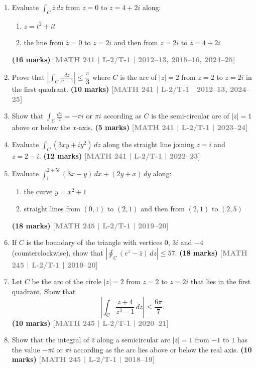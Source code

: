\documentclass[12pt]{article}
\newcommand{\yr}[1]{\hfill\textcolor{gray}{\small\textbf{[#1]}}}
\newcommand{\mk}[1]{\textcolor{orange!70!black}{\small\textbf{(#1 marks)}}}
\begin{document}
\begin{enumerate}

  \item Evaluate $\displaystyle\int_{C}\bar{z}\,dz$ from $z=0$ to $z=4+2i$ along: 
\begin{enumerate}
  \item $z=t^{2}+it$
  \item the line from $z=0$ to $z=2i$ and then from $z=2i$ to $z=4+2i$
\end{enumerate}
\mk{16} \yr{MATH 241 | L-2/T-1 | 2012--13, 2015--16, 2024--25}

\item Prove that $\left|\displaystyle\int_{C}\frac{dz}{z^{2}-1}\right|\le\dfrac{\pi}{3}$ where $C$ is the arc of $|z|=2$ from $z=2$ to $z=2i$ in the first quadrant.
\mk{10} \yr{MATH 241 | L-2/T-1 | 2012--13, 2024--25}

\item Show that $\displaystyle\int_{C}\frac{dz}{z}=-\pi i$ or $\pi i$ according as $C$ is the semi-circular arc of $|z|=1$ above or below the $x$-axis.
\mk{5} \yr{MATH 241 | L-2/T-1 | 2023--24}

\item Evaluate $\displaystyle\int_{C}(3xy+iy^{2})\,dz$ along the straight line joining $z=i$ and $z=2-i$.
\mk{12} \yr{MATH 241 | L-2/T-1 | 2022--23}

\item Evaluate $\displaystyle\int_{i}^{2+5i}(3x-y)\,dx+(2y+x)\,dy$ along: 
\begin{enumerate}
  \item the curve $y=x^{2}+1$
  \item straight lines from $(0,1)$ to $(2,1)$ and then from $(2,1)$ to $(2,5)$
\end{enumerate}
\mk{18} \yr{MATH 245 | L-2/T-1 | 2019--20}

\item If $C$ is the boundary of the triangle with vertices $0$, $3i$ and $-4$ (counterclockwise), show that $\left|\displaystyle\oint_{C}(e^{z}-\bar{z})\,dz\right|\le 57$.
\mk{18} \yr{MATH 245 | L-2/T-1 | 2019--20}

\item Let $C$ be the arc of the circle $|z|=2$ from $z=2$ to $z=2i$ that lies in the first quadrant. Show that
\[
\left|\int_{C} \frac{z+4}{z^{3}-1}\,dz\right| \leq \frac{6\pi}{7}.
\]
\mk{10} \yr{MATH 245 | L-2/T-1 | 2020--21}

\item Show that the integral of $\bar{z}$ along a semicircular arc $|z|=1$ from $-1$ to $1$ has the value $-\pi i$ or $\pi i$ according as the arc lies above or below the real axis.
\mk{10} \yr{MATH 245 | L-2/T-1 | 2018--19}


\end{enumerate}
\end{document}
